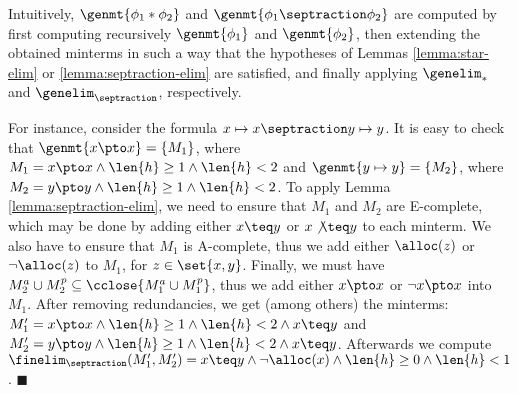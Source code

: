Intuitively, $\genmt{\phi_1 * \phi_2}$ and $\genmt{\phi_1 \septraction
  \phi_2}$ are computed by first computing recursively
$\genmt{\phi_1}$ and $\genmt{\phi_2}$, then extending the obtained
minterms in such a way that the hypotheses of Lemmas
\ref{lemma:star-elim} or \ref{lemma:septraction-elim} are satisfied,
and finally applying $\genelim_*$ and $\genelim_{\septraction}$,
respectively.
\begin{example}
For instance, consider the formula $x \mapsto x \septraction y \mapsto
y$.  It is easy to check that $\genmt{x \pto x} = \{ M_1 \}$, where
$M_1 = x \pto x \wedge \len{h} \geq 1 \wedge \len{h} < 2$ and
$\genmt{y \mapsto y} = \{ M_2 \}$, where $M_2 = y \pto y \wedge
\len{h} \geq 1 \wedge \len{h} < 2$.  To apply Lemma
\ref{lemma:septraction-elim}, we need to ensure that $M_1$ and $M_2$
are E-complete, which may be done by adding either $x \teq y$ or $x
\not \teq y$ to each minterm.  We also have to ensure that $M_1$ is
A-complete, thus we add either $\alloc(z)$ or $\neg \alloc(z)$ to
$M_1$, for $z\in \set{x,y}$. Finally, we must have $M_2^a \cup M_2^p
\subseteq \cclose{M_1^a \cup M_1^p}$, thus we add either $x \pto x$ or
$\neg x \pto x$ into $M_1$. After removing redundancies, we get (among
others) the minterms: $M_1' = x \pto x \wedge \len{h} \geq 1 \wedge
\len{h} < 2 \wedge x \teq y$ and $M'_2= y \pto y \wedge \len{h} \geq 1
\wedge \len{h} < 2 \wedge x \teq y$.  Afterwards we compute
$\finelim_{\septraction}(M_1',M_2') = x \teq y \wedge \neg \alloc(x)
\wedge \len{h} \geq 0 \wedge \len{h} < 1$. \hfill$\blacksquare$
\end{example}

